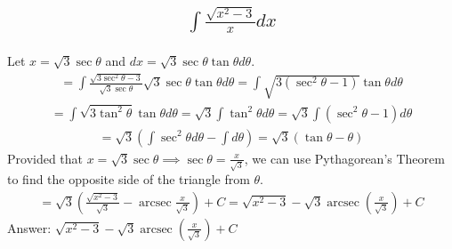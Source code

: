 \documentclass{article}
\DeclareMathOperator{\arcsec}{arcsec}
\begin{document}
\subsection{
	\begin{align*}
		\int{\frac{\sqrt{x^2 - 3}}{x} dx}
	\end{align*}
}
Let $x = \sqrt{3}\sec{\theta}$ and $dx = \sqrt{3}\sec{\theta}\tan{\theta}d\theta$. 
\begin{align*}
	= \int{\frac{\sqrt{3\sec^2{\theta} - 3}}{\sqrt{3}\sec{\theta}}\sqrt{3}\sec{\theta}\tan{\theta}d\theta} = \int{\sqrt{3(\sec^2{\theta} - 1)}\tan{\theta}d\theta}
\end{align*}
\begin{align*}
	= \int{\sqrt{3 \tan^2{\theta}}\tan{\theta}d\theta} = \sqrt{3} \int{\tan^2{\theta}d\theta} = \sqrt{3} \int{(\sec^2{\theta} - 1)d\theta}
\end{align*}
\begin{align*}
	= \sqrt{3} \left( \int{\sec^2{\theta}d\theta} - \int{d\theta} \right) = \sqrt{3} \left( \tan{\theta} - \theta \right)
\end{align*}
Provided that $x = \sqrt{3} \sec{\theta} \implies \sec{\theta} = \frac{x}{\sqrt{3}}$, we can use Pythagorean's Theorem to find the opposite side of the triangle from $\theta$. 
\begin{align*}
	= \sqrt{3} \left( \frac{\sqrt{x^2 - 3}}{\sqrt{3}} - \arcsec{\frac{x}{\sqrt{3}}} \right) + C= \sqrt{x^2 - 3} - \sqrt{3} \arcsec{\left( \frac{x}{\sqrt{3}} \right)} + C
\end{align*}
Answer: $\sqrt{x^2 - 3} - \sqrt{3} \arcsec{\left( \frac{x}{\sqrt{3}} \right)} + C$

\end{document}
